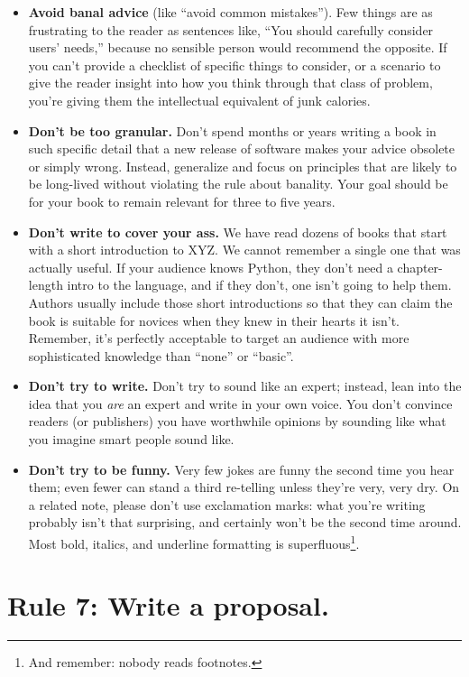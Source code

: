 \documentclass[10pt,letterpaper]{article}
\begin{document}
\begin{itemize}
\item
  \textbf{Avoid banal advice} (like ``avoid common mistakes'').  Few
  things are as frustrating to the reader as sentences like, ``You
  should carefully consider users' needs,'' because no sensible person
  would recommend the opposite.  If you can't provide a checklist of
  specific things to consider, or a scenario to give the reader
  insight into how you think through that class of problem, you're
  giving them the intellectual equivalent of junk calories.
\item
  \textbf{Don't be too granular.}  Don't spend months or years writing
  a book in such specific detail that a new release of software makes
  your advice obsolete or simply wrong.  Instead, generalize and focus
  on principles that are likely to be long-lived without violating the
  rule about banality.  Your goal should be for your book to remain
  relevant for three to five years.
\item
  \textbf{Don't write to cover your ass.}  We have read dozens of
  books that start with a short introduction to XYZ.  We cannot
  remember a single one that was actually useful.  If your audience
  knows Python, they don't need a chapter-length intro to the
  language, and if they don't, one isn't going to help them.  Authors
  usually include those short introductions so that they can claim the
  book is suitable for novices when they knew in their hearts it
  isn't.  Remember, it's perfectly acceptable to target an audience
  with more sophisticated knowledge than ``none'' or ``basic''.
\item
  \textbf{Don't try to write.}  Don't try to sound like an expert;
  instead, lean into the idea that you \emph{are} an expert and write
  in your own voice.  You don't convince readers (or publishers) you
  have worthwhile opinions by sounding like what you imagine smart
  people sound like.
\item
  \textbf{Don't try to be funny.}  Very few jokes are funny the second
  time you hear them; even fewer can stand a third re-telling unless
  they're very, very dry.  On a related note, please don't use
  exclamation marks: what you're writing probably isn't that
  surprising, and certainly won't be the second time around.  Most
  bold, italics, and underline formatting is superfluous\footnote{And
  remember: nobody reads footnotes.}.
\end{itemize}

\section*{Rule 7: Write a proposal.}
\end{document}
